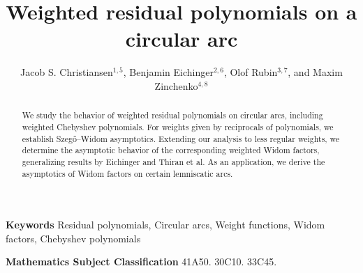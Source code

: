 \documentclass[12pt,oneside,reqno]{amsart}
\author{Jacob S. Christiansen$^{1,5}$, Benjamin Eichinger$^{2,6}$, Olof Rubin$^{3,7}$, and Maxim Zinchenko$^{4,8}$}
\title{Weighted residual polynomials on a circular arc}
\theoremstyle{definition}
\numberwithin{equation}{section}
\begin{document}
\begin{abstract}
We study the behavior of weighted residual polynomials on circular arcs, including weighted Chebyshev polynomials. For weights given by reciprocals of polynomials, we establish Szeg\H{o}–Widom asymptotics. Extending our analysis to less regular weights, we determine the asymptotic behavior of the corresponding weighted Widom factors, generalizing results by Eichinger and Thiran et al. As an application, we derive the asymptotics of Widom factors on certain lemniscatic arcs.
\end{abstract}
	\medskip	
	
	{\bf Keywords} {Residual polynomials, Circular arcs, Weight functions, Widom factors, Chebyshev polynomials}
	
\medskip	
	
	{\bf Mathematics Subject Classification} {41A50. 30C10. 33C45.}

\maketitle
\end{document}
